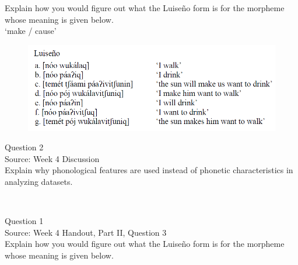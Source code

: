 \documentclass[12pt]{article}
\begin{document}
Explain how you would figure out what the Luiseño form is for the morpheme whose meaning is given below.\\

‘make / cause’

\begin{figure}[H]
\includegraphics{../images/luiseno.png}
\end{figure}

\newpage

{\large Question 2}\\

Source: Week 4 Discussion\\

Explain why phonological features are used instead of phonetic characteristics in analyzing datasets.\\


\newpage

\begin{center}
\textbf{{\color{red}{\HUGE END OF EXAM}}}\\

\end{center}
\newpage

\begin{center}
\textbf{{\color{blue}{\HUGE START OF EXAM\\}}}

\textbf{{\color{blue}{\HUGE Student ID: 16758\\}}}

\textbf{{\color{blue}{\HUGE 9:40\\}}}

\end{center}
\newpage

{\large Question 1}\\

Source: Week 4 Handout, Part II, Question 3\\

Explain how you would figure out what the Luiseño form is for the morpheme whose meaning is given below.\\
\end{document}
